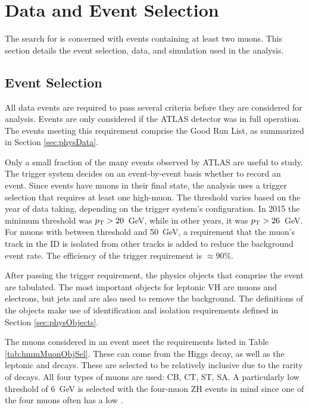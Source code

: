 \section{Data and Event Selection}\label{sec:hmmEvSel}

The search for \hmm is concerned with events containing at least two muons.
This section details the event selection, data, and simulation used in the analysis.

\subsection{Event Selection}\label{sec:hmmEv}

All data events are required to pass several criteria before they are considered for analysis.
Events are only considered if the ATLAS detector was in full operation.
The events meeting this requirement comprise the Good Run List, as summarized in Section \ref{sec:physData}.

Only a small fraction of the many events observed by ATLAS are useful to study. 
The trigger system decides on an event-by-event basis whether to record an event. 
Since \hmm events have muons in their final state, the analysis uses a trigger selection that requires at least one high-\pt muon.
The \pt threshold varies based on the year of data taking, depending on the trigger system's configuration.
In 2015 the minimum threshold was $p_\text{T}>20$~GeV, while in other years, it was $p_\text{T}>26$~GeV.
For muons with \pt between threshold and 50~GeV, a requirement that the muon's track in the ID is isolated from other tracks is added to reduce the background event rate.
The efficiency of the trigger requirement is $\approx90\%$.

After passing the trigger requirement, the physics objects that comprise the event are tabulated.
The most important objects for leptonic VH \hmm are muons and electrons, but jets and \met are also used to remove the background.
The definitions of the objects make use of identification and isolation requirements defined in Section \ref{sec:physObjects}.

The muons considered in an event meet the requirements listed in Table \ref{tab:hmmMuonObjSel}.
These can come from the Higgs decay, as well as the leptonic \W and \Z decays.
These are selected to be relatively inclusive due to the rarity of \hmm decays.
All four types of muons are used: CB, CT, ST, SA.
A particularly low \pt threshold of 6~GeV is selected with the four-muon ZH events in mind since one of the four muons often has a low \pt.

